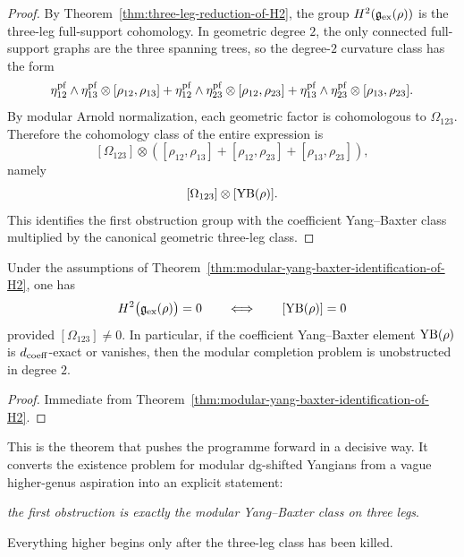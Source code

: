 \begin{proof}
By Theorem~\ref{thm:three-leg-reduction-of-H2}, the group
$H^2(\mathfrak g_{\mathrm{ex}}(\rho))$ is the three-leg full-support cohomology.
In geometric degree $2$, the only connected full-support graphs are the three spanning trees, so the
degree-$2$ curvature class has the form
\[
\eta_{12}^{\mathrm{pf}}\wedge\eta_{13}^{\mathrm{pf}}\otimes[\rho_{12},\rho_{13}]
+
\eta_{12}^{\mathrm{pf}}\wedge\eta_{23}^{\mathrm{pf}}\otimes[\rho_{12},\rho_{23}]
+
\eta_{13}^{\mathrm{pf}}\wedge\eta_{23}^{\mathrm{pf}}\otimes[\rho_{13},\rho_{23}].
\]
By modular Arnold normalization, each geometric factor is cohomologous to $\Omega_{123}$.
Therefore the cohomology class of the entire expression is
\[
[\Omega_{123}]
\otimes
\left(
[\rho_{12},\rho_{13}]
+
[\rho_{12},\rho_{23}]
+
[\rho_{13},\rho_{23}]
\right),
\]
namely
\[
[\Omega_{123}]\otimes [\mathrm{YB}(\rho)].
\]
This identifies the first obstruction group with the coefficient Yang--Baxter class multiplied by the
canonical geometric three-leg class.
\end{proof}

\begin{corollary}
\label{cor:vanishing-criterion-first-obstruction}
Under the assumptions of
Theorem~\ref{thm:modular-yang-baxter-identification-of-H2}, one has
\[
H^2\bigl(\mathfrak g_{\mathrm{ex}}(\rho)\bigr)=0
\qquad\Longleftrightarrow\qquad
[\mathrm{YB}(\rho)]=0
\]
provided $[\Omega_{123}]\neq 0$.
In particular, if the coefficient Yang--Baxter element $\mathrm{YB}(\rho)$ is $d_{\mathrm{coeff}}$-exact or vanishes,
then the modular completion problem is unobstructed in degree $2$.
\end{corollary}

\begin{proof}
Immediate from Theorem~\ref{thm:modular-yang-baxter-identification-of-H2}.
\end{proof}

\begin{remark}
This is the theorem that pushes the programme forward in a decisive way.
It converts the existence problem for modular dg-shifted Yangians from a vague higher-genus aspiration
into an explicit statement:

\medskip

\centerline{\emph{the first obstruction is exactly the modular Yang--Baxter class on three legs}.}

\medskip

Everything higher begins only after the three-leg class has been killed.
\end{remark}

